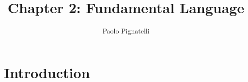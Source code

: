 \documentclass{article}
\title{Chapter 2: Fundamental Language}
\author{Paolo Pignatelli}
\date{}
\begin{document}
\maketitle

\section{Introduction}
\end{document}
